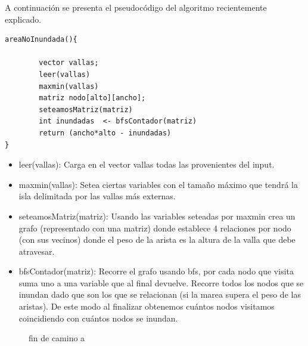 \documentclass[a4paper, 12pt]{article}
\begin{document}
A continuación se presenta el pseudocódigo del algoritmo recientemente explicado.

\begin{verbatim}
areaNoInundada(){

        vector vallas;
        leer(vallas)
        maxmin(vallas)
        matriz nodo[alto][ancho];
        seteamosMatriz(matriz)
        int inundadas  <- bfsContador(matriz)
        return (ancho*alto - inundadas)
}
\end{verbatim}



\begin{itemize}
\item leer(vallas): Carga en el vector vallas todas las provenientes del input.

\item maxmin(vallas): Setea ciertas variables con el tama\~no máximo que tendrá la isla delimitada por las vallas más externas.

\item seteamosMatriz(matriz): Usando las variables seteadas por maxmin crea un grafo (representado con una matriz) donde establece 4 relaciones por nodo (con sus vecinos) donde el peso de la arista es la altura de la valla que debe atravesar.

\item bfsContador(matriz): Recorre el grafo usando bfs, por cada nodo que visita suma uno a una variable que al final devuelve. Recorre todos los nodos que se inundan dado que son los que se relacionan (si la marea supera el peso de las aristas). De este modo al finalizar obtenemos cuántos nodos visitamos coincidiendo con cuántos nodos se inundan.
\end{itemize}

\begin{figure}[H]
\centering
{}
\qquad
{}
\caption{fin de camino a}
\end{figure}
\end{document}
